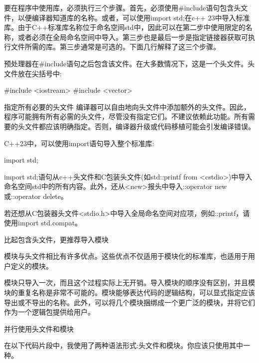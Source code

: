 要在程序中使用库，必须执行三个步骤。首先，必须使用\#include语句包含头文件，以便编译器知道库的名称。或者，可以使用import std;在c++ 23中导入标准库。由于C++标准库名称位于命名空间std中，因此可以在第二步中使用限定的名称，或者必须在全局命名空间中导入。第三步也是最后一步是指定链接器获取可执行文件所需的库。第三步通常是可选的。下面几行解释了这三个步骤。


预处理器在\#include语句之后包含该文件。在大多数情况下，这是一个头文件。头文件放在尖括号中:

\begin{cpp}
#include <iostream>
#include <vector>
\end{cpp}

\begin{myWarning}{指定所有必要的头文件}
编译器可以自由地向头文件中添加额外的头文件。因此，程序可能拥有所有必需的头文件，尽管没有指定它们。不建议依赖此功能。所有需要的头文件都应该明确指定。否则，编译器升级或代码移植可能会引发编译错误。
\end{myWarning}


C++23中，可以使用import语句导入整个标准库:

\begin{cpp}
import std;
\end{cpp}

import std;语句从c++头文件和C包装头文件(如std::printf from <cstdio>)中导入命名空间std中的所有内容。此外，还从<new>报头中导入::operator new或::operator delete。

若还想从C包装器头文件<stdio.h>中导入全局命名空间对应项，例如::printf，请使用import std.compat。

\begin{myWarning}{比起包含头文件，更推荐导入模块}

模块与头文件相比有许多优点。这些优点不仅适用于模块化的标准库，也适用于用户定义的模块。

模块只导入一次，而且这个过程实际上无开销。导入模块的顺序没有区别，并且模块的重复名称是非常不可能的。模块能够表达代码的逻辑结构，可以显式指定应该导出或不导出的名称。此外，可以将几个模块捆绑成一个更广泛的模块，并将它们作为一个逻辑包提供给用户。

\end{myWarning}

\begin{myWarning}{并行使用头文件和模块}

在以下代码片段中，我使用了两种语法形式:头文件和模块。你应该只使用其中一种。

\end{myWarning}

